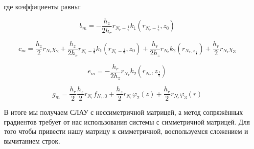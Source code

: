 где коэффициенты равны:

\[
  b_m = - \frac{h_z}{2 h_r} r_{N_r - \frac{1}{2}} k_1 (r_{N_r - \frac{1}{2}}, z_0)
\]

\[
  c_m = \frac{h_z}{2} r_{N_r} \chi_2 + \frac{h_z}{2 h_r} r_{N_r - \frac{1}{2}} k_1 (r_{N_r - \frac{1}{2}}, z_0) 
  + \frac{h_r}{2 h_z} r_{N_r} k_2(r_{N_r, z_{\frac{1}{2}}}) + \frac{h_r}{2} r_{N_r} \chi_3
\]

\[
  e_m = - \frac{h_r}{2 h_z} r_{N_r} k_2(r_{N_r}, z_{\frac{1}{2}}) 
\]

\[
  g_m = \frac{h_r}{2} \frac{h_z}{2} r_{N_r} f_{N_r, 0} + \frac{h_z}{2} r_{N_r} \varphi_2(z) + \frac{h_r}{2} r_{N_r} \varphi_3(r)
\]
\newpage

В итоге мы получаем СЛАУ с нессиметричной матрицей, а метод сопряжённых градиентов
требует от нас использования системы с симметричной матрицей. 
Для того чтобы привести нашу матрицу к симметричной, воспользуемся сложением и вычитанием строк.


